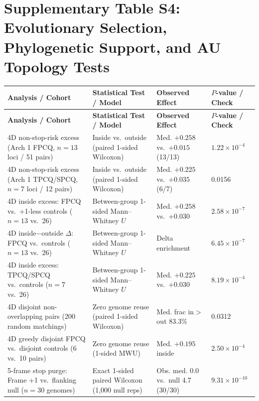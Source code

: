 \documentclass[10pt,letterpaper]{article}
\begin{document}
\section*{Supplementary Table S4: Evolutionary Selection, Phylogenetic Support, and AU Topology Tests}
\vspace{3pt}
{\scriptsize\setlength{\tabcolsep}{3.5pt}\renewcommand{\arraystretch}{1.12}
\begin{longtable}{@{}p{}p{}p{}p{}@{}}
\toprule
\textbf{Analysis / Cohort} & \textbf{Statistical Test / Model} & \textbf{Observed Effect} & \textbf{$P$-value / Check} \\
\midrule
\endfirsthead
\toprule
\textbf{Analysis / Cohort} & \textbf{Statistical Test / Model} & \textbf{Observed Effect} & \textbf{$P$-value / Check} \\
\midrule
\endhead
\bottomrule
\endfoot
4D non-stop-risk excess (Arch 1 FPCQ, $n=13$ loci / 51 pairs) & Inside vs.\ outside (paired 1-sided Wilcoxon) & Med. $+0.258$ vs.\ $+0.015$ (13/13) & $1.22 \times 10^{-4}$ \\
4D non-stop-risk excess (Arch 1 TPCQ/SPCQ, $n=7$ loci / 12 pairs) & Inside vs.\ outside (paired 1-sided Wilcoxon) & Med. $+0.225$ vs.\ $+0.035$ (6/7) & 0.0156 \\
4D inside excess: FPCQ vs.\ +1-less controls ($n=13$ vs.\ 26) & Between-group 1-sided Mann--Whitney $U$ & Med. $+0.258$ vs.\ $+0.030$ & $2.58 \times 10^{-7}$ \\
4D inside$-$outside $\Delta$: FPCQ vs.\ controls ($n=13$ vs.\ 26) & Between-group 1-sided Mann--Whitney $U$ & Delta enrichment & $6.45 \times 10^{-7}$ \\
4D inside excess: TPCQ/SPCQ vs.\ controls ($n=7$ vs.\ 26) & Between-group 1-sided Mann--Whitney $U$ & Med. $+0.225$ vs.\ $+0.030$ & $8.19 \times 10^{-4}$ \\
4D disjoint non-overlapping pairs (200 random matchings) & Zero genome reuse (paired 1-sided Wilcoxon) & Med. frac in$>$out 83.3\% & 0.0312 \\
4D greedy disjoint FPCQ vs.\ disjoint controls (6 vs.\ 10 pairs) & Zero genome reuse (1-sided MWU) & Med. $+0.195$ inside & $2.50 \times 10^{-4}$ \\
5-frame stop purge: Frame +1 vs.\ flanking null ($n=30$ genomes) & Exact 1-sided paired Wilcoxon (1,000 null reps) & Obs. med. 0.0 vs.\ null 4.7 (30/30) & $9.31 \times 10^{-10}$ \\

\end{longtable}}
\end{document}
